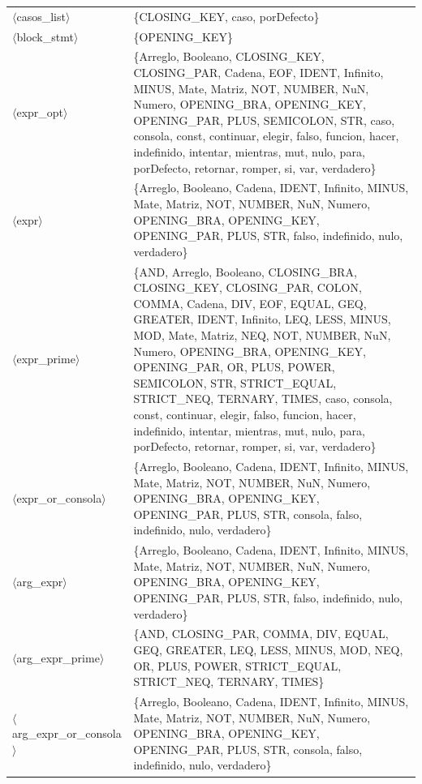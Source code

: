 \documentclass[10pt]{article}
\begin{document}
{\begin{longtable}{@{} p{3.5cm} p{13cm} @{}}
  \parbox[t]{3.3cm}{\raggedright$\langle$casos\_\allowbreak{}list$\rangle$} & \{CLOSING\_KEY, caso, porDefecto\} \\
  \parbox[t]{3.3cm}{\raggedright$\langle$block\_\allowbreak{}stmt$\rangle$} & \{OPENING\_KEY\} \\
  \parbox[t]{3.3cm}{\raggedright$\langle$expr\_\allowbreak{}opt$\rangle$} & \{Arreglo, Booleano, CLOSING\_KEY, CLOSING\_PAR, Cadena, EOF, IDENT, Infinito, MINUS, Mate, Matriz, NOT, NUMBER, NuN, Numero, OPENING\_BRA, OPENING\_KEY, OPENING\_PAR, PLUS, SEMICOLON, STR, caso, consola, const, continuar, elegir, falso, funcion, hacer, indefinido, intentar, mientras, mut, nulo, para, porDefecto, retornar, romper, si, var, verdadero\} \\
  \parbox[t]{3.3cm}{\raggedright$\langle$expr$\rangle$} & \{Arreglo, Booleano, Cadena, IDENT, Infinito, MINUS, Mate, Matriz, NOT, NUMBER, NuN, Numero, OPENING\_BRA, OPENING\_KEY, OPENING\_PAR, PLUS, STR, falso, indefinido, nulo, verdadero\} \\
  \parbox[t]{3.3cm}{\raggedright$\langle$expr\_\allowbreak{}prime$\rangle$} & \{AND, Arreglo, Booleano, CLOSING\_BRA, CLOSING\_KEY, CLOSING\_PAR, COLON, COMMA, Cadena, DIV, EOF, EQUAL, GEQ, GREATER, IDENT, Infinito, LEQ, LESS, MINUS, MOD, Mate, Matriz, NEQ, NOT, NUMBER, NuN, Numero, OPENING\_BRA, OPENING\_KEY, OPENING\_PAR, OR, PLUS, POWER, SEMICOLON, STR, STRICT\_EQUAL, STRICT\_NEQ, TERNARY, TIMES, caso, consola, const, continuar, elegir, falso, funcion, hacer, indefinido, intentar, mientras, mut, nulo, para, porDefecto, retornar, romper, si, var, verdadero\} \\
  \parbox[t]{3.3cm}{\raggedright$\langle$expr\_\allowbreak{}or\_\allowbreak{}consola$\rangle$} & \{Arreglo, Booleano, Cadena, IDENT, Infinito, MINUS, Mate, Matriz, NOT, NUMBER, NuN, Numero, OPENING\_BRA, OPENING\_KEY, OPENING\_PAR, PLUS, STR, consola, falso, indefinido, nulo, verdadero\} \\
  \parbox[t]{3.3cm}{\raggedright$\langle$arg\_\allowbreak{}expr$\rangle$} & \{Arreglo, Booleano, Cadena, IDENT, Infinito, MINUS, Mate, Matriz, NOT, NUMBER, NuN, Numero, OPENING\_BRA, OPENING\_KEY, OPENING\_PAR, PLUS, STR, falso, indefinido, nulo, verdadero\} \\
  \parbox[t]{3.3cm}{\raggedright$\langle$arg\_\allowbreak{}expr\_\allowbreak{}prime$\rangle$} & \{AND, CLOSING\_PAR, COMMA, DIV, EQUAL, GEQ, GREATER, LEQ, LESS, MINUS, MOD, NEQ, OR, PLUS, POWER, STRICT\_EQUAL, STRICT\_NEQ, TERNARY, TIMES\} \\
  \parbox[t]{3.3cm}{\raggedright$\langle$arg\_\allowbreak{}expr\_\allowbreak{}or\_\allowbreak{}consola$\rangle$} & \{Arreglo, Booleano, Cadena, IDENT, Infinito, MINUS, Mate, Matriz, NOT, NUMBER, NuN, Numero, OPENING\_BRA, OPENING\_KEY, OPENING\_PAR, PLUS, STR, consola, falso, indefinido, nulo, verdadero\} \\

\end{longtable}}
\end{document}
